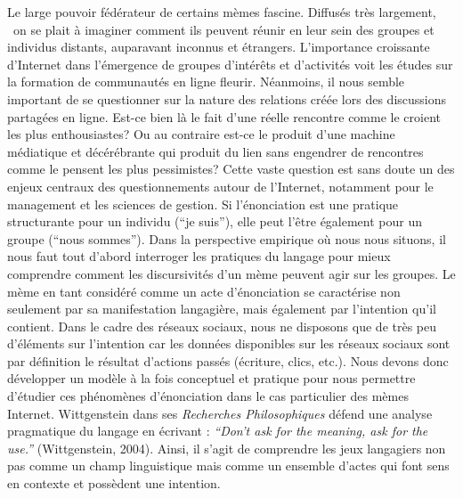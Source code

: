 {\color{black}
Le large pouvoir f\'ed\'erateur de certains m\`emes fascine. Diffus\'es
tr\`es largement, \ on se plait \`a imaginer comment ils peuvent
r\'eunir en leur sein des groupes et individus distants, auparavant
inconnus et \'etrangers. L{\textquoteright}importance croissante
d{\textquoteright}Internet dans l{\textquoteright}\'emergence de
groupes d{\textquoteright}int\'er\^ets et d{\textquoteright}activit\'es
voit les \'etudes sur la formation de communaut\'es en ligne fleurir.
N\'eanmoins, il nous semble important de se questionner sur la nature
des relations cr\'e\'ee lors des discussions partag\'ees en ligne.
Est-ce bien l\`a le fait d{\textquoteright}une r\'eelle rencontre comme
le croient les plus enthousiastes? Ou au contraire est-ce le produit
d{\textquoteright}une machine m\'ediatique et d\'ec\'er\'ebrante qui
produit du lien sans engendrer de rencontres comme le pensent les plus
pessimistes? Cette vaste question est sans doute un des enjeux centraux
des questionnements autour de l{\textquoteright}Internet, notamment
pour le management et les sciences de gestion. Si
l{\textquoteright}\'enonciation est une pratique structurante pour un
individu ({\textquotedblleft}je suis{\textquotedblright}), elle peut
l{\textquoteright}\^etre \'egalement pour un groupe
({\textquotedblleft}nous sommes{\textquotedblright}). Dans la
perspective empirique o\`u nous nous situons, il nous faut tout
d{\textquoteright}abord interroger les pratiques du langage pour mieux
comprendre comment les discursivit\'es d{\textquoteright}un m\`eme
peuvent agir sur les groupes. Le m\`eme en tant consid\'er\'e comme un
acte d{\textquoteright}\'enonciation se caract\'erise non seulement par
sa manifestation langagi\`ere, mais \'egalement par
l{\textquoteright}intention qu{\textquoteright}il contient. Dans le
cadre des r\'eseaux sociaux, nous ne disposons que de tr\`es peu
d{\textquoteright}\'el\'ements sur l{\textquoteright}intention car les
donn\'ees disponibles sur les r\'eseaux sociaux sont par d\'efinition
le r\'esultat d{\textquoteright}actions pass\'es (\'ecriture, clics,
etc.).\textit{ }Nous devons donc d\'evelopper un mod\`ele \`a la fois
conceptuel et pratique pour nous permettre d{\textquoteright}\'etudier
ces ph\'enom\`enes d{\textquoteright}\'enonciation dans le cas
particulier des m\`emes Internet. Wittgenstein dans ses
\textit{Recherches Philosophiques }d\'efend une analyse pragmatique du
langage en \'ecrivant :
\textit{{\textquotedblleft}Don{\textquoteright}t ask for the meaning,
ask for the use.{\textquotedblright}} (Wittgenstein, 2004). Ainsi, il
s{\textquoteright}agit de comprendre les jeux langagiers non pas comme
un champ linguistique mais comme un ensemble d{\textquoteright}actes
qui font sens en contexte et poss\`edent une intention.

}
